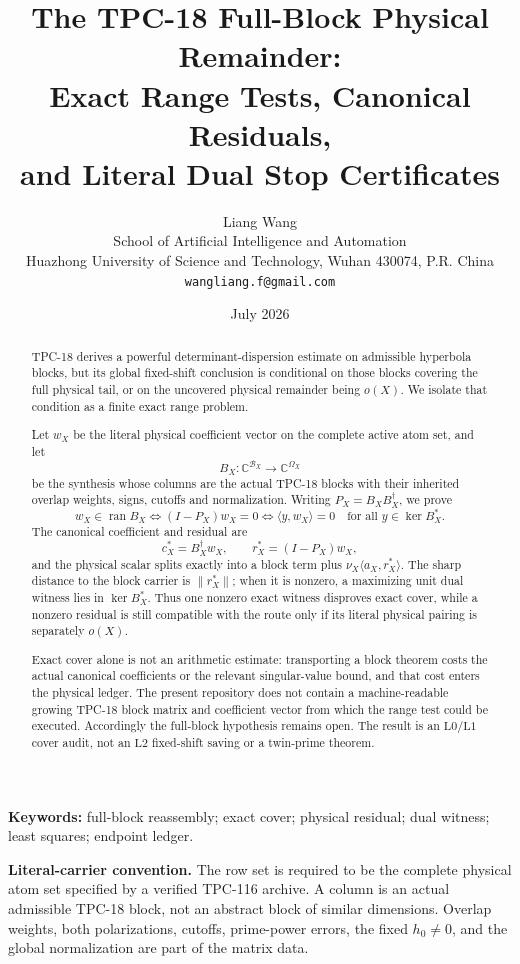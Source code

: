 \documentclass[11pt]{article}
\title{\textbf{The TPC-18 Full-Block Physical Remainder:}\\
Exact Range Tests, Canonical Residuals,\\
and Literal Dual Stop Certificates}
\author{Liang Wang\\
School of Artificial Intelligence and Automation\\
Huazhong University of Science and Technology, Wuhan 430074, P.R. China\\
\texttt{wangliang.f@gmail.com}}
\date{July 2026}
\theoremstyle{definition}
\theoremstyle{remark}
\newcommand{\C}{\mathbb C}
\newcommand{\Lzero}{\mathrm{L0}}
\newcommand{\Lone}{\mathrm{L1}}
\newcommand{\Ltwo}{\mathrm{L2}}
\newcommand{\Ran}{\operatorname{ran}}
\newcommand{\Ker}{\operatorname{ker}}
\newcommand{\Block}{\mathcal B}
\begin{document}
\maketitle

\begin{abstract}
TPC-18 derives a powerful determinant-dispersion estimate on
admissible hyperbola blocks, but its global fixed-shift conclusion is
conditional on those blocks covering the full physical tail, or on
the uncovered physical remainder being \(o(X)\).  We isolate that
condition as a finite exact range problem.

Let \(w_X\) be the literal physical coefficient vector on the
complete active atom set, and let
\[
 B_X:\C^{\Block_X}\longrightarrow\C^{\Omega_X}
\]
be the synthesis whose columns are the actual TPC-18 blocks with
their inherited overlap weights, signs, cutoffs and normalization.
Writing \(P_X=B_XB_X^\dagger\), we prove
\[
 w_X\in\Ran B_X
 \iff (I-P_X)w_X=0
 \iff \langle y,w_X\rangle=0
       \quad\text{for all }y\in\Ker B_X^*.
\]
The canonical coefficient and residual are
\[
 c_X^*=B_X^\dagger w_X,\qquad
 r_X^*=(I-P_X)w_X,
\]
and the physical scalar splits exactly into a block term plus
\(\nu_X\langle a_X,r_X^*\rangle\).  The sharp distance to the block
carrier is \(\|r_X^*\|\); when it is nonzero, a maximizing unit dual
witness lies in \(\Ker B_X^*\).  Thus one nonzero exact witness disproves exact
cover, while a nonzero residual is still compatible with the route
only if its literal physical pairing is separately \(o(X)\).

Exact cover alone is not an arithmetic estimate: transporting a
block theorem costs the actual canonical coefficients or the
relevant singular-value bound, and that cost enters the physical
ledger.  The present repository does not contain a machine-readable
growing TPC-18 block matrix and coefficient vector from which the
range test could be executed.  Accordingly the full-block
hypothesis remains open.  The result is an \(\Lzero/\Lone\) cover
audit, not an \(\Ltwo\) fixed-shift saving or a twin-prime theorem.
\end{abstract}

\noindent\textbf{Keywords:}
full-block reassembly; exact cover; physical residual; dual witness;
least squares; endpoint ledger.

\medskip
\noindent\textbf{Literal-carrier convention.}
The row set is required to be the complete physical atom set
specified by a verified TPC-116 archive.  A
column is an actual admissible TPC-18 block, not an abstract block of
similar dimensions.  Overlap weights, both polarizations, cutoffs,
prime-power errors, the fixed \(h_0\ne0\), and the global
normalization are part of the matrix data.
\end{document}
